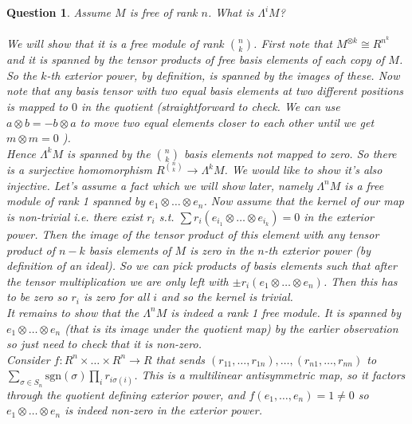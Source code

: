 \documentclass[a4paper]{article}
\newtheorem{que}[thm]{Question}
\begin{document}
\begin{que} Assume $M$ is free of rank $n$. What is $\Lambda^i M$?\\\\
    We will show that it is a free module of rank $\binom{n}{k}$. First note that $M^{\otimes k}\cong R^{n^{k}}$ and it is spanned by the tensor products of free basis elements of each copy of $M$. So the $k$-th exterior power, by definition, is spanned by the images of these. Now note that any basis tensor with two equal basis elements at two different positions is mapped to $0$ in the quotient (straightforward to check. We can use $a\otimes b=-b\otimes a$ to move two equal elements closer to each other until we get $m\otimes m=0$ ).\\
    Hence $\Lambda^{k}M$ is spanned by the $\binom{n}{k}$ basis elements not mapped to zero. So there is a surjective homomorphism $R^{\binom{n}{k}}\to \Lambda^{k}M$. We would like to show it's also injective. Let's assume a fact which we will show later, namely $\Lambda^{n}M$ is a free module of rank 1 spanned by $e_1\otimes \ldots\otimes e_n$. Now assume that the kernel of our map is non-trivial i.e. there exist $r_i$ s.t. $\sum r_i (e_{i_1}\otimes \ldots\otimes e_{i_k})=0$ in the exterior power. Then the image of the tensor product of this element with any tensor product of $n-k$ basis elements of $M$ is zero in the  $n$-th exterior power (by definition of an ideal). So we can pick products of basis elements such that after the tensor multiplication we are only left with  $\pm r_i \left( e_1 \otimes \ldots \otimes e_n \right) $. Then this has to be zero so $r_i$ is zero for all $i$ and so the kernel is trivial.\\
    It remains to show that the $\Lambda^{n}M$ is indeed a rank 1 free module. It is spanned by $e_1\otimes \ldots\otimes e_n$ (that is its image under the quotient map) by the earlier observation so just need to check that it is non-zero. \\Consider $f:R^{n}\times \ldots\times R^{n}\to R$ that sends $\left( r_{11},\ldots,r_{1n} \right),\ldots,\left(r_{n1},\ldots,r_{nn}\right) $ to $\sum_{\sigma\in S_n}\text{sgn}\left( \sigma \right) \prod_{i} r_{i\sigma\left( i \right) }$. This is a multilinear antisymmetric map, so it factors through the quotient defining exterior power, and $f(e_1,\ldots , e_n ) = 1\neq 0$ so $e_1\otimes \ldots\otimes e_n$ is indeed non-zero in the exterior power.
\end{que}
\end{document}
